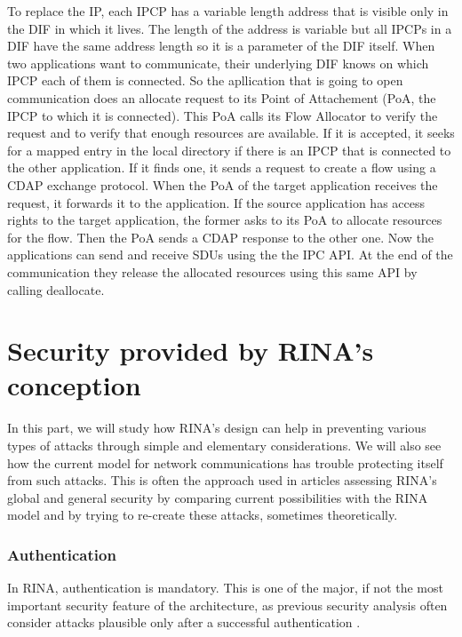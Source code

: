 \documentclass[a4paper]{proc}
\begin{document}
To replace the IP, each IPCP has a variable length address that is visible only
in the DIF in which it lives.  The length of the address is variable but all IPCPs
in a DIF have the same address length so it is a parameter of the DIF itself.
When two applications want to communicate, their underlying DIF knows on which
IPCP each of them is connected.  So the apllication that is going to open
communication does an allocate request to its Point of Attachement (PoA, the
IPCP to which it is connected).  This PoA calls its Flow Allocator to verify the
request and to verify that enough resources are available.  If it is accepted,
it seeks for a mapped entry in the local directory if there is an IPCP that is
connected to the other application.  If it finds one, it sends a request to
create a flow using a CDAP exchange protocol.  When the PoA of the target
application receives the request, it forwards it to the application.  If the
source application has access rights to the target application, the former asks
to its PoA to allocate resources for the flow.  Then the PoA sends a CDAP
response to the other one.  Now the applications can send and receive SDUs using
the the IPC API\@.  At the end of the communication they release the allocated
resources using this same API by calling deallocate.\cite{Trouva2011ISTI}


\part{Security provided by RINA's conception}

In this part, we will study how RINA's design can help in preventing various
types of attacks through simple and elementary considerations. We will also see
how the current model for network communications has trouble protecting itself
from such attacks. This is often the approach used in articles assessing RINA's
global and general security by comparing current possibilities with the RINA
model and by trying to re-create these attacks, sometimes theoretically.

\section{Authentication}

In RINA, authentication is mandatory. This is one of the major, if not the most
important security feature of the architecture, as previous security analysis
often consider attacks plausible only after a successful authentication
\cite{assessing-security, wiki, PINS}.
\end{document}
